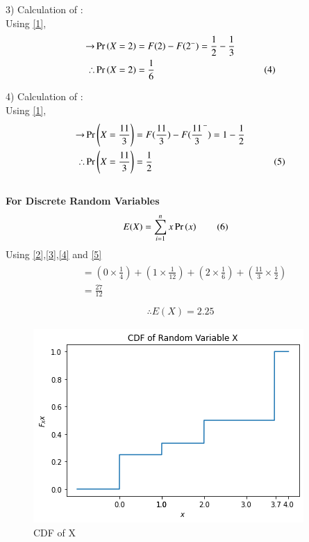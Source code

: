 \documentclass[journal,12pt,twocolumn]{IEEEtran}
\begin{document}
3) Calculation of : \\[2mm]
Using \eqref{1},
\begin{align*}
\rightarrow &\Pr\left(X=2\right)=F(2)-F(2^-)=\frac{1}{2}-\frac{1}{3}& \\
\therefore &\Pr\left(X=2\right)=\frac{1}{6}& \tag{4} \label{4} 
\end{align*}

4) Calculation of : \\[2mm]
Using \eqref{1},
\begin{align*}
\rightarrow &\Pr\left(X=\frac{11}{3}\right)=F(\frac{11}{3})-F({\frac{11}{3}}^-)=1-\frac{1}{2}& \\
\therefore &\Pr\left(X=\frac{11}{3}\right)=\frac{1}{2}& \tag{5} \label{5} 
\end{align*}
\\
\textbf{For Discrete Random Variables}
\begin{align*}
E(X)&=\sum_{i=1}^{n} x\Pr\left(x\right) \tag{6} \label{6}
\end{align*}
Using \eqref{2},\eqref{3},\eqref{4} and \eqref{5}
\begin{align*}
\begin{split}
    &=(0\times \frac{1}{4})+(1\times \frac{1}{12})+(2\times \frac{1}{6})+(\frac{11}{3}\times \frac{1}{2}) \\
    &=\frac{27}{12} \\
\end{split}
\end{align*}
\begin{align*}
\therefore E(X)=2.25 \tag{7} \label{7}
\end{align*}
\newpage
\begin{figure}[ht]
    \centering
    \includegraphics[width=\columnwidth]{CDF.png}
    \caption{CDF of X}
    \label{fig:1}
\end{figure}
\end{document}
